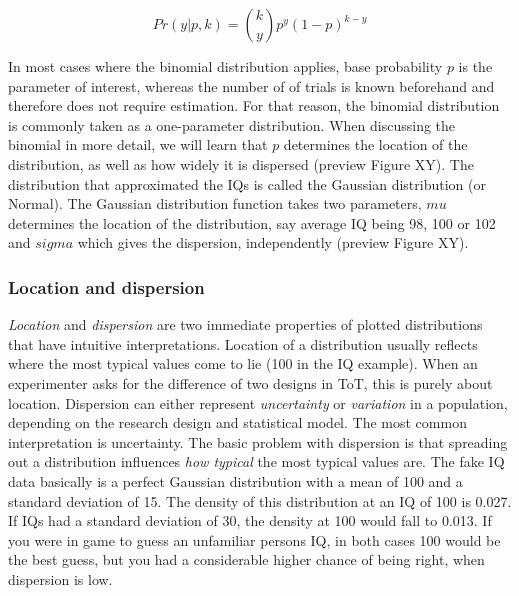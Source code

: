 \documentclass[]{svmono}
\newenvironment{Shaded}{\begin{snugshade}}{\end{snugshade}}
\newcommand{\KeywordTok}[1]{\textcolor[rgb]{0.13,0.29,0.53}{\textbf{#1}}}
\newcommand{\DataTypeTok}[1]{\textcolor[rgb]{0.13,0.29,0.53}{#1}}
\newcommand{\DecValTok}[1]{\textcolor[rgb]{0.00,0.00,0.81}{#1}}
\newcommand{\StringTok}[1]{\textcolor[rgb]{0.31,0.60,0.02}{#1}}
\newcommand{\OperatorTok}[1]{\textcolor[rgb]{0.81,0.36,0.00}{\textbf{#1}}}
\newcommand{\NormalTok}[1]{#1}
\begin{document}
\[
Pr(y|p,k) = {k  \choose y}p^y(1-p)^{k-y}
\]

In most cases where the binomial distribution applies, base probability
\(p\) is the parameter of interest, whereas the number of of trials is
known beforehand and therefore does not require estimation. For that
reason, the binomial distribution is commonly taken as a one-parameter
distribution. When discussing the binomial in more detail, we will learn
that \(p\) determines the location of the distribution, as well as how
widely it is dispersed (preview Figure XY). The distribution that
approximated the IQs is called the Gaussian distribution (or Normal).
The Gaussian distribution function takes two parameters, \(mu\)
determines the location of the distribution, say average IQ being 98,
100 or 102 and \(sigma\) which gives the dispersion, independently
(preview Figure XY).

\subsubsection{Location and dispersion}\label{location-and-dispersion}

\emph{Location} and \emph{dispersion} are two immediate properties of
plotted distributions that have intuitive interpretations. Location of a
distribution usually reflects where the most typical values come to lie
(100 in the IQ example). When an experimenter asks for the difference of
two designs in ToT, this is purely about location. Dispersion can either
represent \emph{uncertainty} or \emph{variation} in a population,
depending on the research design and statistical model. The most common
interpretation is uncertainty. The basic problem with dispersion is that
spreading out a distribution influences \emph{how typical} the most
typical values are. The fake IQ data basically is a perfect Gaussian
distribution with a mean of 100 and a standard deviation of 15. The
density of this distribution at an IQ of 100 is 0.027. If IQs had a
standard deviation of 30, the density at 100 would fall to 0.013. If you
were in game to guess an unfamiliar persons IQ, in both cases 100 would
be the best guess, but you had a considerable higher chance of being
right, when dispersion is low.

\begin{Shaded}
\end{Shaded}
\end{document}
